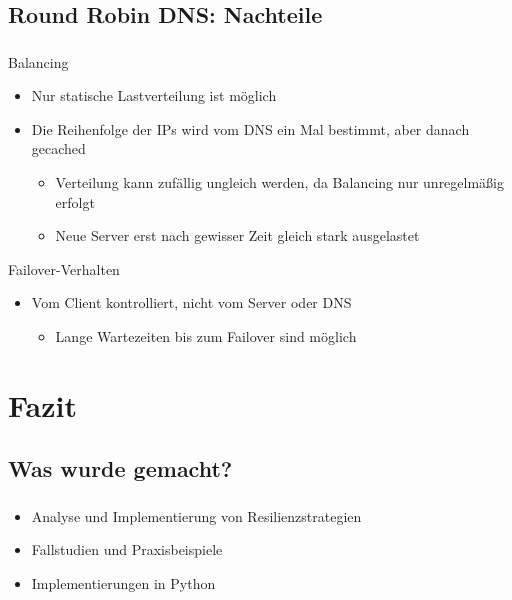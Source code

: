 \subsection{Round Robin DNS: Nachteile}
\begin{frame}
    \frametitle{\insertsection}
    \framesubtitle{\insertsubsection}

    \begin{block}{Balancing}
	    \begin{itemize}
	    	\item Nur statische Lastverteilung ist möglich
	    	\item Die Reihenfolge der IPs wird vom DNS ein Mal bestimmt, aber danach gecached
	    	\begin{itemize}
	    		\item Verteilung kann zufällig ungleich werden, da Balancing nur unregelmäßig erfolgt
	    		\item Neue Server erst nach gewisser Zeit gleich stark ausgelastet
	    	\end{itemize}
	    \end{itemize}
    \end{block}

    \begin{block}{Failover-Verhalten}
	    \begin{itemize}
	    	\item Vom Client kontrolliert, nicht vom Server oder DNS
	    	\begin{itemize}
	    		\item Lange Wartezeiten bis zum Failover sind möglich
	    	\end{itemize}
	    \end{itemize}
    \end{block}

\end{frame}

\section{Fazit}
\subsection{Was wurde gemacht?}

\begin{frame}
    \frametitle{\insertsection}
    \framesubtitle{\insertsubsection}

    \begin{itemize}
        \item Analyse und Implementierung von Resilienzstrategien
        \item Fallstudien und Praxisbeispiele
        \item Implementierungen in Python
    \end{itemize}
\end{frame}

